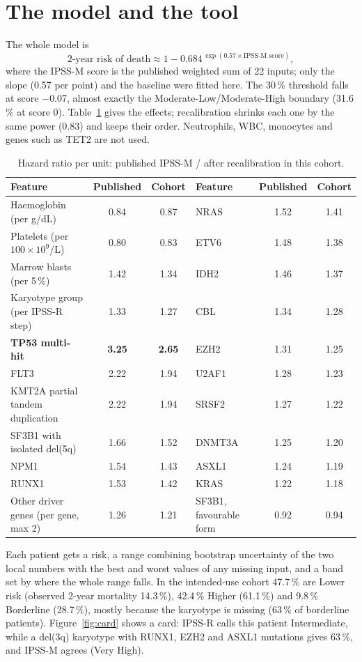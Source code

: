 \documentclass[11pt,a4paper]{article}
\begin{document}
\section{The model and the tool}
The whole model is
\[
\text{2-year risk of death} \approx 1 - 0.684^{\,\exp(0.57 \times \text{IPSS-M score})},
\]
where the IPSS-M score is the published weighted sum of 22 inputs; only the slope (0.57 per point) and the baseline were fitted here. The 30\,\% threshold falls at score $-0.07$, almost exactly the Moderate-Low/Moderate-High boundary (31.6\,\% at score 0). Table~\ref{tab:weights} gives the effects; recalibration shrinks each one by the same power (0.83) and keeps their order. Neutrophils, WBC, monocytes and genes such as TET2 are not used.

\begin{table}[h]
\centering\small
\setlength{\tabcolsep}{4pt}
\caption{Hazard ratio per unit: published IPSS-M / after recalibration in this cohort.}\label{tab:weights}
\begin{tabular}{@{}lcc@{\hspace{0.8cm}}lcc@{}}
\toprule
Feature & Published & Cohort & Feature & Published & Cohort\\
\midrule
Haemoglobin (per g/dL) & 0.84 & 0.87 & NRAS & 1.52 & 1.41\\
Platelets (per $100\times10^9$/L) & 0.80 & 0.83 & ETV6 & 1.48 & 1.38\\
Marrow blasts (per 5\,\%) & 1.42 & 1.34 & IDH2 & 1.46 & 1.37\\
Karyotype group (per IPSS-R step) & 1.33 & 1.27 & CBL & 1.34 & 1.28\\
\textbf{TP53 multi-hit} & \textbf{3.25} & \textbf{2.65} & EZH2 & 1.31 & 1.25\\
FLT3 & 2.22 & 1.94 & U2AF1 & 1.28 & 1.23\\
KMT2A partial tandem duplication & 2.22 & 1.94 & SRSF2 & 1.27 & 1.22\\
SF3B1 with isolated del(5q) & 1.66 & 1.52 & DNMT3A & 1.25 & 1.20\\
NPM1 & 1.54 & 1.43 & ASXL1 & 1.24 & 1.19\\
RUNX1 & 1.53 & 1.42 & KRAS & 1.22 & 1.18\\
Other driver genes (per gene, max 2) & 1.26 & 1.21 & SF3B1, favourable form & 0.92 & 0.94\\
\bottomrule
\end{tabular}
\end{table}

Each patient gets a risk, a range combining bootstrap uncertainty of the two local numbers with the best and worst values of any missing input, and a band set by where the whole range falls. In the intended-use cohort 47.7\,\% are Lower risk (observed 2-year mortality 14.3\,\%), 42.4\,\% Higher (61.1\,\%) and 9.8\,\% Borderline (28.7\,\%), mostly because the karyotype is missing (63\,\% of borderline patients). Figure~\ref{fig:card} shows a card: IPSS-R calls this patient Intermediate, while a del(3q) karyotype with RUNX1, EZH2 and ASXL1 mutations gives 63\,\%, and IPSS-M agrees (Very High).
\end{document}
